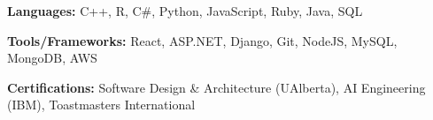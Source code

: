 
\begin{siderulesSos}
\begin{skillSection}
\cvskillentry
    {
      \begin{cvsositems}
        \item {\color{black}\textbf{Languages:} C++, R, C\#, Python, JavaScript, Ruby, Java, SQL}
        \item {\color{black}\textbf{Tools/Frameworks:} React, ASP.NET, Django, Git, NodeJS, MySQL, MongoDB, AWS}
        \item {\color{black}\textbf{Certifications:} Software Design \& Architecture (UAlberta), AI Engineering (IBM), Toastmasters International}
      \end{cvsositems}
    }
\end{skillSection}
\end{siderulesSos}